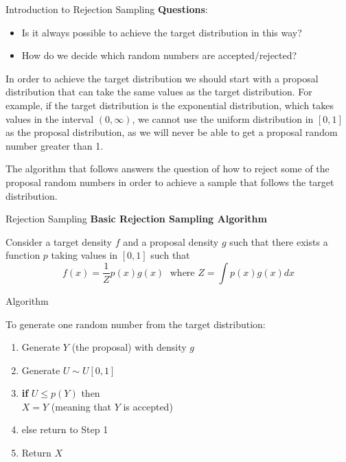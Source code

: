 \documentclass[8pt]{beamer}
\begin{document}
\begin{frame}{Introduction to Rejection Sampling}
\textbf{Questions}: 

\begin{itemize}
\item Is it always possible to achieve the target distribution in this way?
\item How do we decide which random numbers are accepted/rejected?
\end{itemize}

\pause

In order to achieve the target distribution we should start with a proposal distribution that can take the same values as the target distribution.
For example, if the target distribution is the exponential distribution, which takes values in the interval $(0,\infty)$, we cannot use the uniform distribution in $[0,1]$
as the proposal distribution, as we will never be able to get a proposal random number greater than 1.

\vspace{2mm}
\pause

The algorithm that follows answers the question of how to reject some of the proposal random numbers in order to achieve a sample that follows the target distribution. 
\end{frame}


\begin{frame}{Rejection Sampling}
\textbf{Basic Rejection Sampling Algorithm}

Consider a target density $f$ and a proposal density $g$ such that there exists a function $p$ taking values in $[0,1]$ such that 
\begin{equation*}
f(x)=\frac{1}{Z}p(x)g(x)  \; \text{ where } Z=\int p(x) g(x) dx
\end{equation*}

\alert{Algorithm}

To generate one random number from the target distribution:

\begin{enumerate}
	\item Generate $Y$ (the proposal) with density $g$ 
	\item Generate $U \sim U[0,1]$
	\item {\bf if} $U \leq p(Y)$ then \\
       $X=Y$ (meaning that $Y$ is accepted)\\  
	\item else return to Step 1
	\item Return $X$
\end{enumerate}
\end{frame}
\end{document}

